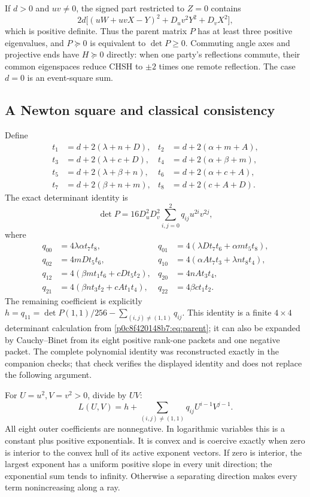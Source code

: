 If $d>0$ and $uv\ne0$, the signed part restricted to $Z=0$ contains
\[2d\big[(uW+uvX-Y)^2+D_uv^2Y^2+D_vX^2\big],\]
which is positive definite. Thus the parent matrix $P$ has at least three positive eigenvalues, and $P\succeq0$ is equivalent to $\det P\ge0$. Commuting angle axes and projective ends have $H\succeq0$ directly: when one party's reflections commute, their common eigenspaces reduce CHSH to $\pm2$ times one remote reflection. The case $d=0$ is an event-square sum.

\subsection{A Newton square and classical consistency}
Define
\begin{align*}
t_1&=d+2(\lambda+n+D),&t_2&=d+2(\alpha+m+A),\\
t_3&=d+2(\lambda+c+D),&t_4&=d+2(\alpha+\beta+m),\\
t_5&=d+2(\lambda+\beta+n),&t_6&=d+2(\alpha+c+A),\\
t_7&=d+2(\beta+n+m),&t_8&=d+2(c+A+D).
\end{align*}
The exact determinant identity is
\[
\det P=16D_u^2D_v^2\sum_{i,j=0}^2q_{ij}u^{2i}v^{2j},
\]
where
\begin{align*}
q_{00}&=4\lambda\alpha t_7t_8,&q_{01}&=4(\lambda Dt_7t_6+\alpha mt_5t_8),\\
q_{02}&=4mDt_5t_6,&q_{10}&=4(\alpha At_7t_3+\lambda nt_8t_4),\\
q_{12}&=4(\beta mt_1t_6+cDt_5t_2),&q_{20}&=4nAt_3t_4,\\
q_{21}&=4(\beta nt_3t_2+cAt_1t_4),&q_{22}&=4\beta ct_1t_2.
\end{align*}
The remaining coefficient is explicitly $h=q_{11}=\det P(1,1)/256-\sum_{(i,j)\ne(1,1)}q_{ij}$. This identity is a finite $4\times4$ determinant calculation from \eqref{p0c8f420148b7:eq:parent}; it can also be expanded by Cauchy--Binet from its eight positive rank-one packets and one negative packet. The complete polynomial identity was reconstructed exactly in the companion checks; that check verifies the displayed identity and does not replace the following argument.

For $U=u^2,V=v^2>0$, divide by $UV$:
\[L(U,V)=h+\sum_{(i,j)\ne(1,1)}q_{ij}U^{i-1}V^{j-1}.\]
All eight outer coefficients are nonnegative. In logarithmic variables this is a constant plus positive exponentials. It is convex and is coercive exactly when zero is interior to the convex hull of its active exponent vectors. If zero is interior, the largest exponent has a uniform positive slope in every unit direction; the exponential sum tends to infinity. Otherwise a separating direction makes every term nonincreasing along a ray.

